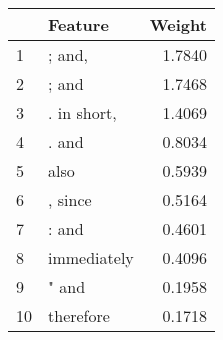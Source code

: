 \begin{tabular}{llr}
\toprule
{} &      Feature &  Weight \\
\midrule
1  &       ; and, &  1.7840 \\
2  &        ; and &  1.7468 \\
3  &  . in short, &  1.4069 \\
4  &        . and &  0.8034 \\
5  &         also &  0.5939 \\
6  &      , since &  0.5164 \\
7  &        : and &  0.4601 \\
8  &  immediately &  0.4096 \\
9  &        " and &  0.1958 \\
10 &    therefore &  0.1718 \\
\bottomrule
\end{tabular}
